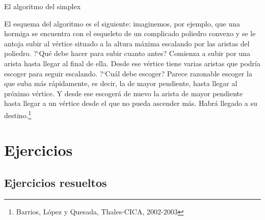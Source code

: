 \begin{myblock}{El algoritmo del simplex}
\begin{small}
\vspace{2mm} El esquema del algoritmo es el siguiente:  imaginemos, por ejemplo, que una hormiga se encuentra con el esqueleto de un complicado poliedro convexo y se le antoja subir al vértice situado a la altura máxima escalando por las aristas del poliedro. ?`Qué debe hacer para subir cuanto antes? Comienza a subir por una arista hasta llegar al final de ella. Desde ese vértice tiene varias aristas que podría escoger para seguir escalando. ?`Cuál debe escoger? Parece razonable escoger la que suba más rápidamente, es decir, la de mayor pendiente, hasta llegar al próximo vértice. Y desde ese escogerá de nuevo la arista de mayor pendiente hasta llegar a un vértice desde el que no pueda ascender más. Habrá llegado a su destino.\footnote{Barrios, López y Quesada, Thales-CICA, 2002-2003 } 

\end{small}	
\end{myblock}


\section{Ejercicios}
	\vspace{10mm}




	\subsection{Ejercicios resueltos}
	\vspace{10mm}

